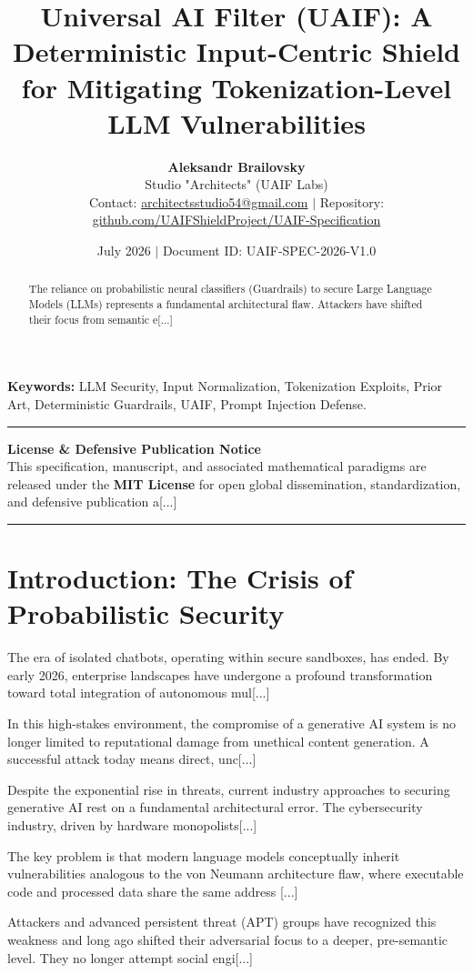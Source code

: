 \documentclass[10pt,a4paper]{article}
\title{\textbf{Universal AI Filter (UAIF): A Deterministic Input-Centric Shield for Mitigating Tokenization-Level LLM Vulnerabilities}}
\author{\textbf{Aleksandr Brailovsky}\\Studio "Architects" (UAIF Labs)\\
\small Contact: \href{mailto:architectsstudio54@gmail.com}{architectsstudio54@gmail.com} $|$ Repository: \href{https://github.com/UAIFShieldProject/UAIF-Specification}{github.com/UAIFShieldProject/UAIF-Specification}}
\date{July 2026 $|$ Document ID: UAIF-SPEC-2026-V1.0}
\begin{document}
\maketitle

\begin{abstract}
The reliance on probabilistic neural classifiers (Guardrails) to secure Large Language Models (LLMs) represents a fundamental architectural flaw. Attackers have shifted their focus from semantic e[...]
\end{abstract}

\noindent\textbf{Keywords:} LLM Security, Input Normalization, Tokenization Exploits, Prior Art, Deterministic Guardrails, UAIF, Prompt Injection Defense.

\vspace{0.3cm}
\noindent\rule{\textwidth}{0.4pt}
\begin{center}
\small\textbf{License \& Defensive Publication Notice}\\
\small This specification, manuscript, and associated mathematical paradigms are released under the \textbf{MIT License} for open global dissemination, standardization, and defensive publication a[...]
\end{center}
\noindent\rule{\textwidth}{0.4pt}

\section{Introduction: The Crisis of Probabilistic Security}
The era of isolated chatbots, operating within secure sandboxes, has ended. By early 2026, enterprise landscapes have undergone a profound transformation toward total integration of autonomous mul[...]

In this high-stakes environment, the compromise of a generative AI system is no longer limited to reputational damage from unethical content generation. A successful attack today means direct, unc[...]

Despite the exponential rise in threats, current industry approaches to securing generative AI rest on a fundamental architectural error. The cybersecurity industry, driven by hardware monopolists[...]

The key problem is that modern language models conceptually inherit vulnerabilities analogous to the von Neumann architecture flaw, where executable code and processed data share the same address [...]

Attackers and advanced persistent threat (APT) groups have recognized this weakness and long ago shifted their adversarial focus to a deeper, pre-semantic level. They no longer attempt social engi[...]
\end{document}

